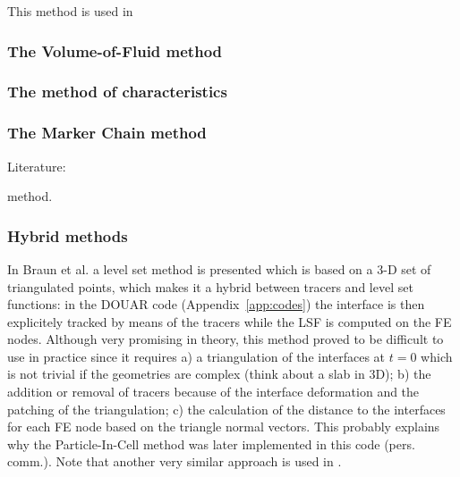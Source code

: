 This method is used in \cite{vyrc13}


\subsubsection{The Volume-of-Fluid method}

\cite{hini81}

\subsubsection{The method of characteristics}


\cite{devv00a}

\subsubsection{The Marker Chain method}

Literature: \cite{woid78,chri82,chyu84,vaks97}

 method. 


\subsubsection{Hybrid methods}

In Braun et al. \cite{brtf08} a level set method is presented which is based on a 3-D set
of triangulated points, which makes it a hybrid between tracers and level set functions:
in the DOUAR code (Appendix~\ref{app:codes}) the interface is then explicitely tracked by means of the tracers while the LSF is computed 
on the FE nodes. Although very promising in theory, this method proved to be difficult to use in practice
since it requires a) a triangulation of the interfaces at $t=0$ which is not trivial if the geometries
are complex (think about a slab in 3D); b) the addition or removal of tracers because of the interface deformation
and the patching of the triangulation; c) the calculation of the distance to the interfaces for each 
FE node based on the triangle normal vectors. 
This probably explains why the Particle-In-Cell method was later implemented in this code (pers. comm.).
Note that another very similar approach is used in \cite{saev10}.



